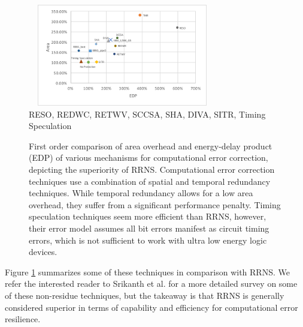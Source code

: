 \documentclass{sig-alternate}
\begin{document}
\begin{figure}[H]
\begin{center}
\setlength{\abovecaptionskip}{-0.2mm} 
\includegraphics[width=3.25in,height=1.75in]{graphics/RelatedComp.pdf}
\\
\scriptsize{RESO\cite{RESO}, REDWC\cite{REDWC}, RETWV\cite{RETWV}, SCCSA\cite{SCCSA}, SHA\cite{SHA}, DIVA\cite{DIVA}, SITR\cite{SITR}, Timing Speculation\cite{razor_2003,decor_2008}}
\caption{First order comparison of area overhead and energy-delay product (EDP) of various mechanisms for computational error correction, depicting the superiority of RRNS. Computational error correction techniques use a combination of spatial and temporal redundancy techniques. While temporal redundancy allows for a low area overhead, they suffer from a significant performance penalty. Timing speculation techniques seem more efficient than RRNS, however, their error model assumes all bit errors manifest as circuit timing errors, which is not sufficient to work with ultra low energy logic devices.}
\label{fig:related}
\end{center}
\vspace{-3mm}
\end{figure}

Figure \ref{fig:related} summarizes some of these techniques in comparison with RRNS. We refer the interested reader to Srikanth et al.\cite{srikanth2016brief} for a more detailed survey on some of these non-residue techniques, but the takeaway is that RRNS is generally considered superior in terms of capability and efficiency for computational error resilience. 
\end{document}
